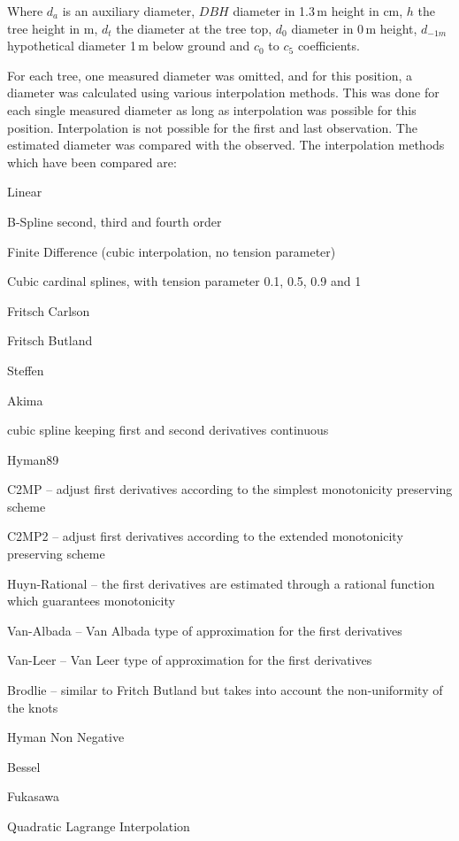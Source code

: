 \documentclass[twocolumn]{scrartcl}
\begin{document}
Where $d_{a}$ is an auxiliary diameter, $DBH$ diameter in 1.3\,m height in cm,
$h$ the tree height in m, $d_t$ the diameter at the tree top, $d_0$ diameter in
0\,m height, $d_{-1m}$ hypothetical diameter 1\,m below ground and $c_0$ to
$c_5$ coefficients.

For each tree, one measured diameter was omitted, and for this position, a
diameter was calculated using various interpolation methods. This was done for
each single measured diameter as long as interpolation was possible for this
position. Interpolation is not possible for the first and last observation. The
estimated diameter was compared with the observed. The interpolation methods
which have been compared are: %

\begin{description}[nolistsep]
  \item[A] Linear
  \item[B] B-Spline second, third and fourth order
  \item[C] Finite Difference (cubic interpolation, no tension parameter)
  \item[D] Cubic cardinal splines, with tension parameter 0.1, 0.5, 0.9 and 1
  \item[E] Fritsch Carlson \citep{fritschCarlson1980interpolation}
  \item[F] Fritsch Butland \citep{fritschButland1984interpolation}
  \item[G] Steffen \citep{steffen1990interpolation}
  \item[H] Akima \citep{akima1970interpolation}
  \item[I] cubic spline keeping first and second derivatives continuous
  \item[J] Hyman89 \citep{Dougherty1989interpolation}
  \item[K] C2MP -- adjust first derivatives according to the simplest monotonicity preserving scheme \citep{huynh1993interpolation}
  \item[L] C2MP2 -- adjust first derivatives according to the extended monotonicity preserving scheme \citep{huynh1993interpolation}
  \item[M] Huyn-Rational -- the first derivatives are estimated through a rational function which guarantees monotonicity \citep{huynh1993interpolation}
  \item[N] Van-Albada -- Van Albada type of approximation for the first derivatives \citep{huynh1993interpolation}
  \item[O] Van-Leer -- Van Leer type of approximation for the first derivatives \citep{huynh1993interpolation}
  \item[P] Brodlie -- similar to Fritch Butland but takes into account the non-uniformity of the knots
  \item[Q] Hyman Non Negative
  \item[R] Bessel
  \item[S] Fukasawa
  \item[T] Quadratic Lagrange Interpolation
\end{description}
\end{document}
